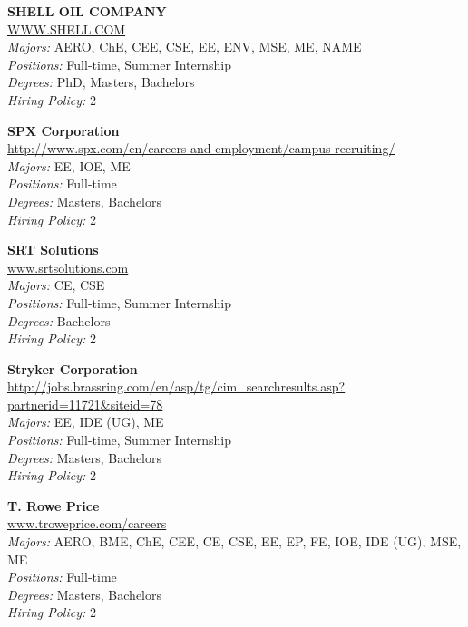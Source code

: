 \documentclass[twoside]{article}
\begin{document}
\begin{center}
\begin{multicols}{3}
\begin{minipage}{.9\columnwidth}{\Large\bf SHELL OIL COMPANY }\\
	\url{WWW.SHELL.COM}\\
	\emph{Majors:} AERO, ChE, CEE, CSE, EE, ENV, MSE, ME, NAME\\
	\emph{Positions:} Full-time, Summer Internship\\
	\emph{Degrees:} PhD, Masters, Bachelors\\
	\emph{Hiring Policy:} 2\\
\end{minipage}
 
\begin{minipage}{.9\columnwidth}{\Large\bf SPX Corporation }\\
	\url{http://www.spx.com/en/careers-and-employment/campus-recruiting/}\\
	\emph{Majors:} EE, IOE, ME\\
	\emph{Positions:} Full-time\\
	\emph{Degrees:} Masters, Bachelors\\
	\emph{Hiring Policy:} 2\\
\end{minipage}
 
\begin{minipage}{.9\columnwidth}{\Large\bf SRT Solutions }\\
	\url{www.srtsolutions.com}\\
	\emph{Majors:} CE, CSE\\
	\emph{Positions:} Full-time, Summer Internship\\
	\emph{Degrees:} Bachelors\\
	\emph{Hiring Policy:} 2\\
\end{minipage}
 
\begin{minipage}{.9\columnwidth}{\Large\bf Stryker Corporation }\\
	\url{http://jobs.brassring.com/en/asp/tg/cim_searchresults.asp?partnerid=11721&siteid=78}\\
	\emph{Majors:} EE, IDE (UG), ME\\
	\emph{Positions:} Full-time, Summer Internship\\
	\emph{Degrees:} Masters, Bachelors\\
	\emph{Hiring Policy:} 2\\
\end{minipage}
 
\begin{minipage}{.9\columnwidth}{\Large\bf T. Rowe Price }\\
	\url{www.troweprice.com/careers}\\
	\emph{Majors:} AERO, BME, ChE, CEE, CE, CSE, EE, EP, FE, IOE, IDE (UG), MSE, ME\\
	\emph{Positions:} Full-time\\
	\emph{Degrees:} Masters, Bachelors\\
	\emph{Hiring Policy:} 2\\
\end{minipage}
 

\end{multicols}
\end{center}
\end{document}
